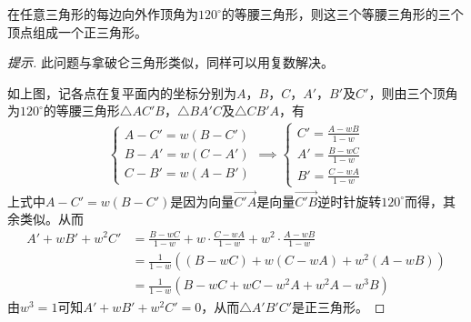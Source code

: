 \begin{example}[美国，1956]
  在任意三角形的每边向外作顶角为$120^\circ$的等腰三角形，则这三个等腰三角形的三个顶点组成一个正三角形。
\end{example}
\begin{proof}[提示]
  此问题与拿破仑三角形类似，同样可以用复数解决。
  \begin{center}
  \end{center}
  如上图，记各点在复平面内的坐标分别为$A$，$B$，$C$，$A'$，$B'$及$C'$，则由三个顶角为$120^\circ$的等腰三角形$\triangle AC'B$，$\triangle BA'C$及$\triangle CB'A$，有
  \begin{align*}
    \begin{cases}
      A-C'=w(B-C')\\
      B-A'=w(C-A')\\
      C-B'=w(A-B')
    \end{cases}
    \implies
    \begin{cases}
      C' = \frac{A-wB}{1-w}\\
      A' = \frac{B-wC}{1-w}\\
      B' = \frac{C-wA}{1-w}
    \end{cases}
  \end{align*}
  上式中$A-C'=w(B-C')$是因为向量$\vec{C'A}$是向量$\vec{C'B}$逆时针旋转$120^\circ$而得，其余类似。从而
  \begin{align*}
    A' + wB' + w^2C' &= \frac{B-wC}{1-w} + w\cdot\frac{C-wA}{1-w} + w^2\cdot\frac{A-wB}{1-w}\\
                     &= \frac1{1-w}\left( (B-wC) + w(C-wA) + w^2(A-wB) \right)\\
                     &= \frac1{1-w}\left( B-wC + wC-w^2A + w^2A-w^3B \right)
  \end{align*}
  由$w^3=1$可知$A'+wB'+w^2C'=0$，从而$\triangle A'B'C'$是正三角形。
\end{proof}

